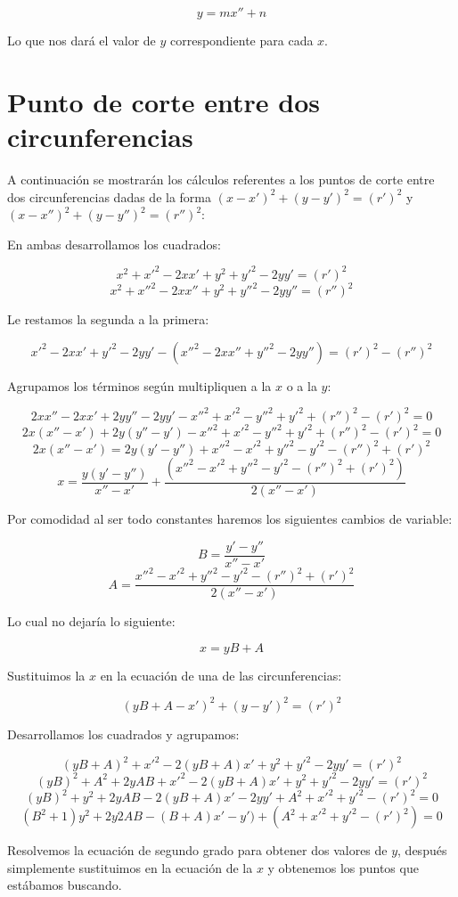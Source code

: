 $$y = mx'' + n$$

Lo que nos dará el valor de $y$ correspondiente para cada $x$.\par

\section{Punto de corte entre dos circunferencias}\label{c-c}

A continuación se mostrarán los cálculos referentes a los puntos de corte entre dos circunferencias dadas de la forma $(x-x')^2 + (y -y')^2 = (r')^2$ y $(x-x'')^2 + (y -y'')^2 = (r'')^2$: \par

En ambas desarrollamos los cuadrados:\par

$$x^2 + x'^2 - 2xx' + y^2 + y'^2 - 2yy' = (r')^2$$
$$x^2 + x''^2 - 2xx'' + y^2 + y''^2 - 2yy'' = (r'')^2$$

Le restamos la segunda a la primera:\par

$$x'^2 - 2xx' + y'^2 - 2yy' -(x''^2 - 2xx'' + y''^2 - 2yy'') = (r')^2 - (r'')^2$$

Agrupamos los términos según multipliquen a la $x$ o a la $y$:\par

$$ 2xx'' - 2xx' + 2yy'' - 2yy' - x''^2 + x'^2 - y''^2 + y'^2 + (r'')^2 - (r')^2 = 0$$
$$ 2x(x'' - x') + 2y(y'' - y') - x''^2 + x'^2 - y''^2 + y'^2 + (r'')^2 - (r')^2 = 0$$
$$ 2x(x'' - x') = 2y(y' - y'') + x''^2 - x'^2 + y''^2 - y'^2 - (r'')^2 + (r')^2 $$
$$ x =\frac{y(y' - y'')}{x'' - x'} + \frac{(x''^2 - x'^2 + y''^2 - y'^2 - (r'')^2 + (r')^2)}{2(x'' - x')} $$

Por comodidad al ser todo constantes haremos los siguientes cambios de variable:\par

$$B = \frac{y' - y''}{x'' - x'}$$
$$A = \frac{x''^2 - x'^2 + y''^2 - y'^2 - (r'')^2 + (r')^2}{2(x'' - x')}$$

Lo cual no dejaría lo siguiente:\par

$$ x = yB + A$$

Sustituimos la $x$ en la ecuación de una de las circunferencias:\par

$$(yB + A-x')^2 + (y -y')^2 = (r')^2$$

Desarrollamos los cuadrados y agrupamos:\par

$$(yB + A)^2 + x'^2 - 2(yB + A)x' + y^2 + y'^2 - 2yy' = (r')^2$$
$$ (yB)^2 + A^2 + 2yAB + x'^2 - 2(yB + A)x' + y^2 + y'^2 - 2yy' = (r')^2$$
$$ (yB)^2 + y^2 + 2yAB - 2(yB + A)x' - 2yy' + A^2 + x'^2 + y'^2 - (r')^2 = 0$$
$$ (B^2 + 1)y^2 + 2y2AB - (B + A)x' - y') + (A^2 + x'^2 + y'^2 - (r')^2) = 0$$

Resolvemos la ecuación de segundo grado para obtener dos valores de $y$, después simplemente sustituimos en la ecuación de la $x$ y obtenemos los puntos que estábamos buscando.\par
